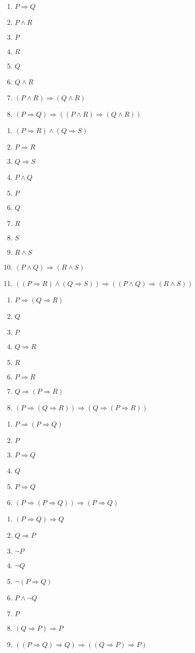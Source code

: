 \documentclass{article}
\newcommand{\bi}{\begin{enumerate}}
\newcommand{\ii}{\item}
\newcommand{\ei}{\end{enumerate}}
\newcommand{\imp}{\Rightarrow}
\begin{document}
\begin{multicols}{2}

\bi
\ii $P\imp Q$
\ii $P\land R$
\ii $P$
\ii $R$
\ii $Q$
\ii $Q\land R$
\ii $(P\land R) \imp (Q\land R)$
\ii $(P\imp Q)\imp ((P\land R) \imp (Q\land R))$
\ei

\bigskip

\bi
\ii $(P\imp R)\land (Q\imp S)$
\ii $P\imp R$
\ii $Q\imp S$
\ii $P\land Q$
\ii $P$
\ii $Q$
\ii $R$
\ii $S$
\ii $R\land S$
\ii $(P\land Q) \imp (R\land S)$
\ii $((P\imp R)\land (Q\imp S)) \imp ((P\land Q) \imp (R\land S))$
\ei

\columnbreak

\bi
\ii $P\imp (Q\imp R)$
\ii $Q$
\ii $P$
\ii $Q\imp R$
\ii $R$
\ii $P\imp R$
\ii $Q\imp (P\imp R)$
\ii $(P\imp (Q\imp R))\imp (Q\imp (P\imp R))$
\ei

\bigskip

\bi
\ii $P\imp(P\imp Q)$
\ii $P$
\ii $P\imp Q$
\ii $Q$
\ii $P\imp Q$
\ii $(P\imp(P\imp Q))\imp (P\imp Q)$
\ei

\bigskip

\bi
\ii $(P\imp Q)\imp Q$
\ii $Q\imp P$
\ii $\neg P$
\ii $\neg Q$
\ii $\neg(P\imp Q)$
\ii $P\land \neg Q$
\ii $P$
\ii $(Q\imp P)\imp P$
\ii $((P\imp Q)\imp Q)\imp ((Q\imp P)\imp P)$
\ei


\end{multicols}
\end{document}
